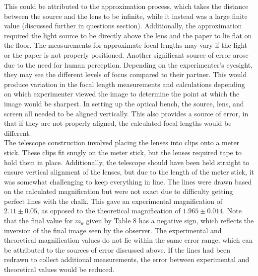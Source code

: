 This could be attributed to the approximation process, which takes the distance between the source and the lens to be infinite, while it instead was a large finite value (discussed further in questions section).
Additionally, the approximation required the light source to be directly above the lens and the paper to lie flat on the floor. 
The measurements for approximate focal lengths may vary if the light or the paper is not properly positioned.
Another significant source of error arose due to the need for human perception. 
Depending on the experimenter's eyesight, they may see the different levels of focus compared to their partner.
This would produce variation in the focal length measurements and calculations depending on which experimenter viewed the image to determine the point at which the image would be sharpest.
In setting up the optical bench, the source, lens, and screen all needed to be aligned vertically. This also provides a source of error, in that if they are not properly aligned, the calculated focal lengths would be different.\\
\indent
The telescope construction involved placing the lenses into clips onto a meter stick. 
These clips fit snugly on the meter stick, but the lenses required tape to hold them in place.
Additionally, the telescope should have been held straight to ensure vertical alignment of the lenses, but due to the length of the meter stick, it was somewhat challenging to keep everything in line.
The lines were drawn based on the calculated magnification but were not exact due to difficulty getting perfect lines with the chalk. 
This gave an experimental magnification of $2.11\pm0.05$, as opposed to the theoretical magnification of $1.965\pm0.014$. 
Note that the final value for $m_\theta$ given by Table 8 has a negative sign, which reflects the inversion of the final image seen by the observer.
The experimental and theoretical magnification values do not lie within the same error range, which can be attributed to the sources of error discussed above. 
If the lines had been redrawn to collect additional measurements, the error between experimental and theoretical values would be reduced. 
